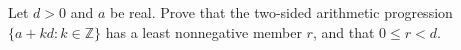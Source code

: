 Let $d>0$ and $a$ be real. Prove that the two-sided arithmetic progression $\{a+kd:k\in\mathbb Z\}$ has a least nonnegative member $r$, and that $0\le r<d$.
